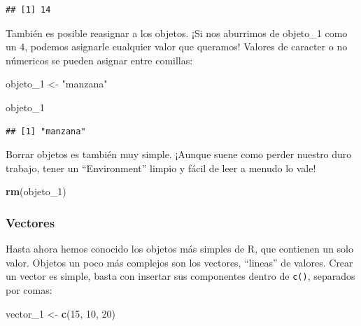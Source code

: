 \documentclass[]{book}
\newenvironment{Shaded}{\begin{snugshade}}{\end{snugshade}}
\newcommand{\KeywordTok}[1]{\textcolor[rgb]{0.13,0.29,0.53}{\textbf{#1}}}
\newcommand{\DecValTok}[1]{\textcolor[rgb]{0.00,0.00,0.81}{#1}}
\newcommand{\StringTok}[1]{\textcolor[rgb]{0.31,0.60,0.02}{#1}}
\newcommand{\NormalTok}[1]{#1}
\begin{document}
\begin{verbatim}
## [1] 14
\end{verbatim}

También es posible reasignar a los objetos. ¡Si nos aburrimos de
objeto\_1 como un 4, podemos asignarle cualquier valor que queramos!
Valores de caracter o no númericos se pueden asignar entre comillas:

\begin{Shaded}
\begin{Highlighting}[]
\NormalTok{objeto_}\DecValTok{1}\NormalTok{ <-}\StringTok{ "manzana"}
\end{Highlighting}
\end{Shaded}

\begin{Shaded}
\begin{Highlighting}[]
\NormalTok{objeto_}\DecValTok{1} 
\end{Highlighting}
\end{Shaded}

\begin{verbatim}
## [1] "manzana"
\end{verbatim}

Borrar objetos es también muy simple. ¡Aunque suene como perder nuestro
duro trabajo, tener un ``Environment'' limpio y fácil de leer a menudo
lo vale!

\begin{Shaded}
\begin{Highlighting}[]
\KeywordTok{rm}\NormalTok{(objeto_}\DecValTok{1}\NormalTok{)}
\end{Highlighting}
\end{Shaded}

\subsubsection{Vectores}\label{vectores}

Hasta ahora hemos conocido los objetos más simples de R, que contienen
un solo valor. Objetos un poco más complejos son los vectores,
``lineas'' de valores. Crear un vector es simple, basta con insertar sus
componentes dentro de \texttt{c()}, separados por comas:

\begin{Shaded}
\begin{Highlighting}[]
\NormalTok{vector_}\DecValTok{1}\NormalTok{ <-}\StringTok{ }\KeywordTok{c}\NormalTok{(}\DecValTok{15}\NormalTok{, }\DecValTok{10}\NormalTok{, }\DecValTok{20}\NormalTok{)}
\end{Highlighting}
\end{Shaded}
\end{document}
